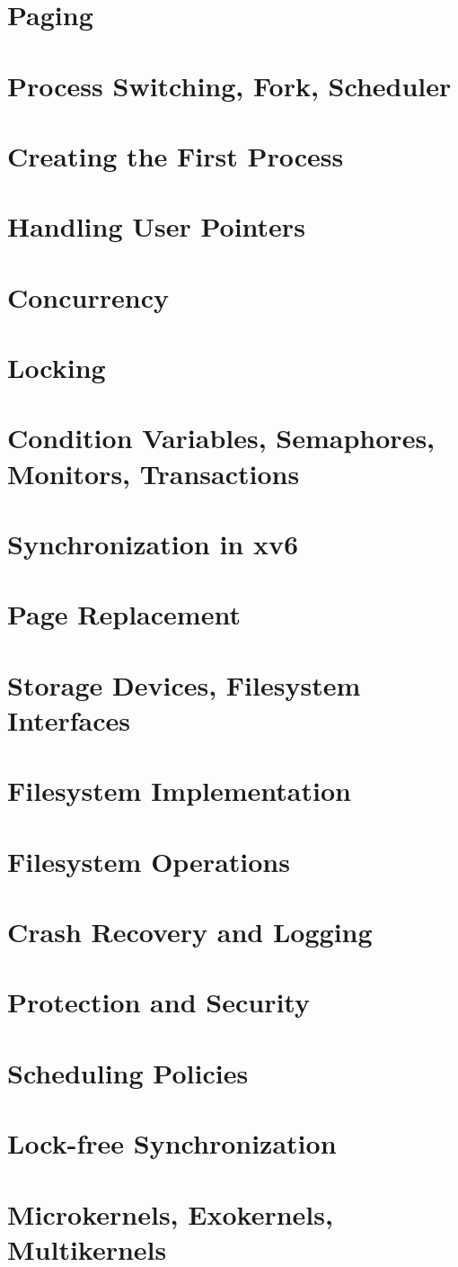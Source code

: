 \section{Paging}

\section{Process Switching, Fork, Scheduler}
\section{Creating the First Process}
\section{Handling User Pointers}
\section{Concurrency}
\section{Locking}
\section{Condition Variables, Semaphores, Monitors, Transactions}
\section{Synchronization in xv6}
\section{Page Replacement}
\section{Storage Devices, Filesystem Interfaces}
\section{Filesystem Implementation}
\section{Filesystem Operations}
\section{Crash Recovery and Logging}
\section{Protection and Security}
\section{Scheduling Policies}
\section{Lock-free Synchronization}
\section{Microkernels, Exokernels, Multikernels}


